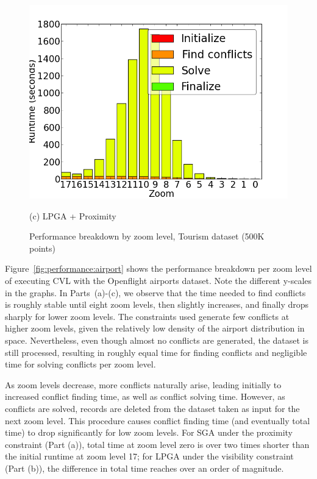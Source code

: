 \begin{figure}[tb]
\begin{minipage}{0.329\linewidth}
    \centerline{\includegraphics[width=1.0\linewidth]{./figs/prelim_pnt_500k_tourism_lp_B.png}}
    \centerline{(c) LPGA + Proximity}
  \end{minipage}
  \vspace{-0ex}
  \caption{Performance breakdown by zoom level, Tourism dataset (500K points)} \label{fig:performance:tourism}
  \vspace{-2ex}
\end{figure}

 Figure~\ref{fig:performance:airport} shows the performance breakdown per zoom level of executing CVL with the Openflight airports dataset. Note the different y-scales in the graphs. In Parts~(a)-(c), we observe that the time needed to find conflicts is roughly stable until eight zoom levels, then slightly increases, and finally drops sharply for lower zoom levels. The constraints used generate few conflicts at higher zoom levels, given the relatively low density of the airport distribution in space. Nevertheless, even though almost no conflicts are generated, the dataset is still processed, resulting in roughly equal time for finding conflicts and negligible time for solving conflicts per zoom level. 
 
As zoom levels decrease, more conflicts naturally arise, leading initially to increased conflict finding time, as well as conflict solving time. However, as conflicts are solved, records are deleted from the dataset taken as input for the next zoom level. This procedure causes conflict finding time (and eventually total time) to drop significantly for low zoom levels. For SGA under the proximity constraint (Part (a)), total time at zoom level zero is over two times shorter than the initial runtime at zoom level 17; for LPGA under the visibility constraint (Part (b)), the difference in total time reaches over an order of magnitude.  

